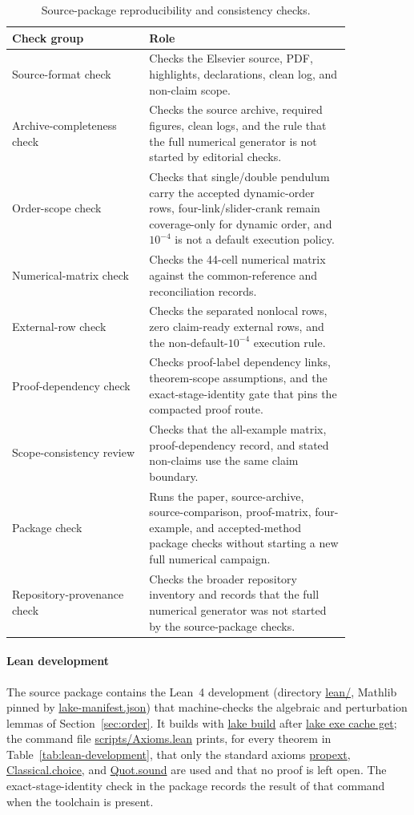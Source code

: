 \documentclass[preprint,12pt]{elsarticle}
\providecommand{\nolinkurl}[1]{\url{#1}}
\begin{document}
\begin{table}[htbp]
\centering
\caption{Source-package reproducibility and consistency checks.}
\label{tab:validators}
\footnotesize
\setlength{\tabcolsep}{4pt}
\renewcommand{\arraystretch}{0.92}
\begin{tabular}{P{0.34\linewidth}P{0.50\linewidth}}
\toprule
Check group & Role \\
\midrule
Source-format check &
Checks the Elsevier source, PDF, highlights, declarations, clean log, and
non-claim scope. \\
Archive-completeness check &
Checks the source archive, required figures, clean logs, and the rule that
the full numerical generator is not started by editorial checks. \\
Order-scope check &
Checks that single/double pendulum carry the accepted dynamic-order rows,
four-link/slider-crank remain coverage-only for dynamic order, and
$10^{-4}$ is not a default execution policy. \\
Numerical-matrix check &
Checks the 44-cell numerical matrix against the common-reference and reconciliation
records. \\
External-row check &
Checks the separated nonlocal rows, zero claim-ready external rows, and the
non-default-\(10^{-4}\) execution rule. \\
Proof-dependency check &
Checks proof-label dependency links, theorem-scope assumptions, and the
exact-stage-identity gate that pins the compacted proof route. \\
Scope-consistency review &
Checks that the all-example matrix, proof-dependency record, and stated
non-claims use the same claim boundary. \\
Package check &
Runs the paper, source-archive, source-comparison, proof-matrix, four-example, and
accepted-method package checks without starting a new full numerical campaign. \\
Repository-provenance check &
Checks the broader repository inventory and records that the full numerical
generator was not started by the source-package checks. \\
\bottomrule
\end{tabular}
\end{table}

\paragraph{Lean development}
The source package contains the Lean~4 development (directory
\nolinkurl{lean/}, Mathlib pinned by \nolinkurl{lake-manifest.json}) that
machine-checks the algebraic and perturbation lemmas of
Section~\ref{sec:order}. It builds with \nolinkurl{lake build} after
\nolinkurl{lake exe cache get}; the command file
\nolinkurl{scripts/Axioms.lean} prints, for every theorem in
Table~\ref{tab:lean-development}, that only the standard axioms
\nolinkurl{propext}, \nolinkurl{Classical.choice}, and
\nolinkurl{Quot.sound} are used and that no proof is left open. The
exact-stage-identity check in the package records the result of that command
when the toolchain is present.
\end{document}
